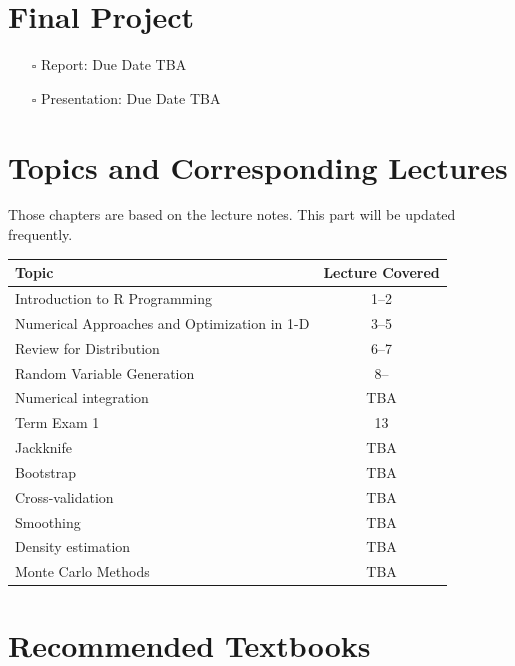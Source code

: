 \documentclass[
  letterpaper,
  DIV=11,
  numbers=noendperiod]{scrreprt}
\providecommand{\tightlist}{%
  \setlength{\itemsep}{0pt}\setlength{\parskip}{0pt}}
\begin{document}
\section*{Final Project}\label{final-project}


\begin{itemize}
\tightlist
\item[$\square$]
  Report: Due Date TBA
\item[$\square$]
  Presentation: Due Date TBA
\end{itemize}

\section*{Topics and Corresponding
Lectures}\label{topics-and-corresponding-lectures}


Those chapters are based on the lecture notes. This part will be updated
frequently.

\begin{longtable}[]{@{}lc@{}}
\toprule\noalign{}
Topic & Lecture Covered \\
\midrule\noalign{}
\endhead
\bottomrule\noalign{}
\endlastfoot
Introduction to R Programming & 1--2 \\
Numerical Approaches and Optimization in 1-D & 3--5 \\
Review for Distribution & 6--7 \\
Random Variable Generation & 8-- \\
Numerical integration & TBA \\
Term Exam 1 & 13 \\
Jackknife & TBA \\
Bootstrap & TBA \\
Cross-validation & TBA \\
Smoothing & TBA \\
Density estimation & TBA \\
Monte Carlo Methods & TBA \\
\end{longtable}

\section*{Recommended Textbooks}\label{recommended-textbooks}
\end{document}
